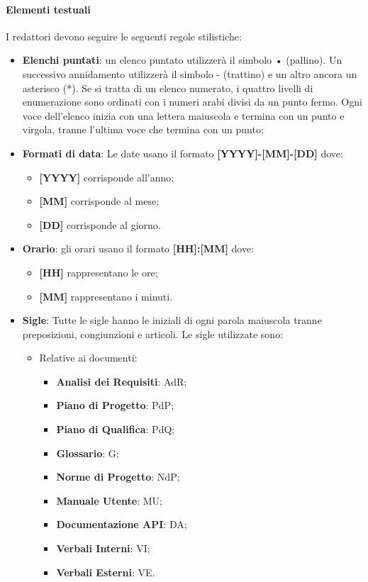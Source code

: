 \paragraph{Elementi testuali}
I redattori devono seguire le seguenti regole stilistiche:
\begin{itemize}
\item \textbf{Elenchi puntati}: un elenco puntato utilizzerà il simbolo • (pallino). Un successivo annidamento utilizzerà il simbolo - (trattino) e un altro ancora un asterisco (*). Se si tratta di un elenco numerato, i quattro livelli di enumerazione sono ordinati con i numeri arabi divisi da un punto fermo. Ogni voce dell’elenco inizia con una lettera maiuscola e termina con un punto e virgola, tranne l'ultima voce che termina con un punto;

\item \textbf{Formati di data}: Le date usano il formato \textbf{[YYYY]-[MM]-[DD]} dove:
    \begin{itemize}
    \item \textbf{[YYYY]} corrisponde all’anno;
    \item \textbf{[MM]} corrisponde al mese;
    \item \textbf{[DD]} corrisponde al giorno.
    \end{itemize}

\item \textbf{Orario}: gli orari usano il formato \textbf{[HH]:[MM]} dove:
    \begin{itemize}
    \item \textbf{[HH]} rappresentano le ore;
    \item \textbf{[MM]} rappresentano i minuti.
    \end{itemize}

\item \textbf{Sigle}: Tutte le sigle hanno le iniziali di ogni parola maiuscola tranne preposizioni, congiunzioni e articoli. Le sigle utilizzate sono:
    \begin{itemize}
    
    \item Relative ai documenti:
        
        \begin{itemize}
        \item \textbf{Analisi dei Requisiti}: AdR;
        \item \textbf{Piano di Progetto}: PdP;
        \item \textbf{Piano di Qualifica}: PdQ;
        \item \textbf{Glossario}: G;
        \item \textbf{Norme di Progetto}: NdP;
        \item \textbf{Manuale Utente}: MU;
        \item \textbf{Documentazione API}: DA;
        \item \textbf{Verbali Interni}: VI;
        \item \textbf{Verbali Esterni}: VE.
        \end{itemize}
          

\end{itemize}
\end{itemize}
